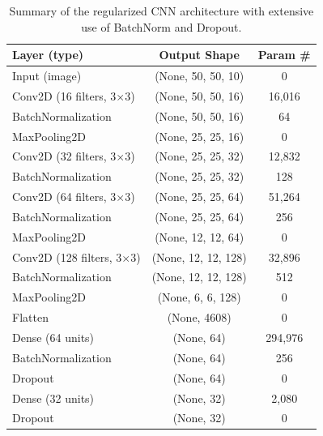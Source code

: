 \begin{table}[ht]
    \centering
    \caption{Summary of the regularized CNN architecture with extensive use of BatchNorm and Dropout.}
    \label{tab:reg-cnn-model}
    \begin{tabular}{|l|c|c|}
        \hline
        \textbf{Layer (type)} & \textbf{Output Shape} & \textbf{Param \#} \\
        \hline
        Input (image)                 & (None, 50, 50, 10)     & 0           \\
        Conv2D (16 filters, 3$\times$3)  & (None, 50, 50, 16)     & 16,016      \\
        BatchNormalization              & (None, 50, 50, 16)     & 64          \\
        MaxPooling2D                    & (None, 25, 25, 16)     & 0           \\
        Conv2D (32 filters, 3$\times$3)  & (None, 25, 25, 32)     & 12,832      \\
        BatchNormalization              & (None, 25, 25, 32)     & 128         \\
        Conv2D (64 filters, 3$\times$3)  & (None, 25, 25, 64)     & 51,264      \\
        BatchNormalization              & (None, 25, 25, 64)     & 256         \\
        MaxPooling2D                    & (None, 12, 12, 64)     & 0           \\
        Conv2D (128 filters, 3$\times$3) & (None, 12, 12, 128)    & 32,896      \\
        BatchNormalization              & (None, 12, 12, 128)    & 512         \\
        MaxPooling2D                    & (None, 6, 6, 128)      & 0           \\
        Flatten                         & (None, 4608)           & 0           \\
        Dense (64 units)                & (None, 64)             & 294,976     \\
        BatchNormalization              & (None, 64)             & 256         \\
        Dropout                         & (None, 64)             & 0           \\
        Dense (32 units)                & (None, 32)             & 2,080       \\
        Dropout                         & (None, 32)             & 0           \\

\end{tabular}
\end{table}
